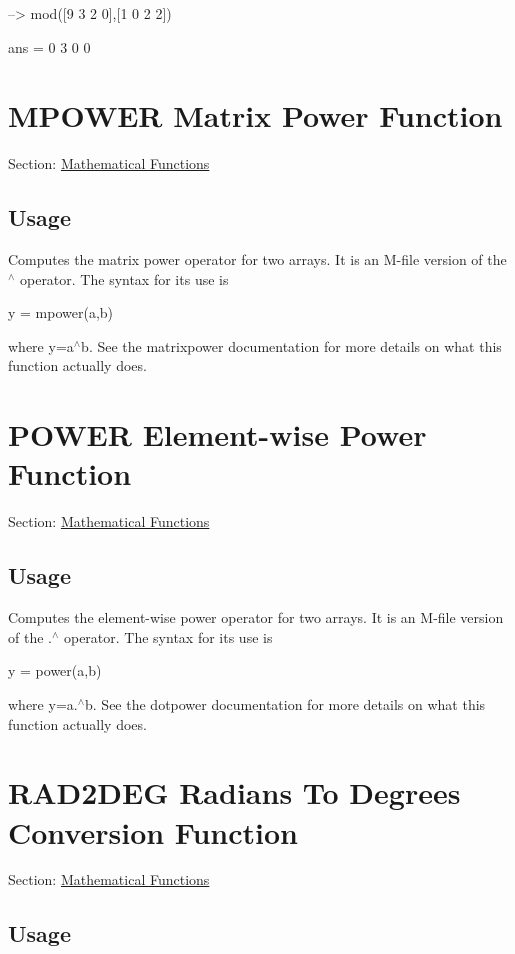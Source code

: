 \begin{DoxyVerbInclude}
--> mod([9 3 2 0],[1 0 2 2])

ans = 
 0 3 0 0 
\end{DoxyVerbInclude}
 \hypertarget{mathfunctions_mpower}{}\section{M\-P\-O\-W\-E\-R Matrix Power Function}\label{mathfunctions_mpower}
Section\-: \hyperlink{sec_mathfunctions}{Mathematical Functions} \hypertarget{vtkwidgets_vtkxyplotwidget_Usage}{}\subsection{Usage}\label{vtkwidgets_vtkxyplotwidget_Usage}
Computes the matrix power operator for two arrays. It is an M-\/file version of the {\ttfamily $^\wedge$} operator. The syntax for its use is \begin{DoxyVerb}   y = mpower(a,b)
\end{DoxyVerb}
 where {\ttfamily y=a$^\wedge$b}. See the {\ttfamily matrixpower} documentation for more details on what this function actually does. \hypertarget{mathfunctions_power}{}\section{P\-O\-W\-E\-R Element-\/wise Power Function}\label{mathfunctions_power}
Section\-: \hyperlink{sec_mathfunctions}{Mathematical Functions} \hypertarget{vtkwidgets_vtkxyplotwidget_Usage}{}\subsection{Usage}\label{vtkwidgets_vtkxyplotwidget_Usage}
Computes the element-\/wise power operator for two arrays. It is an M-\/file version of the {\ttfamily .$^\wedge$} operator. The syntax for its use is \begin{DoxyVerb}   y = power(a,b)
\end{DoxyVerb}
 where {\ttfamily y=a.$^\wedge$b}. See the {\ttfamily dotpower} documentation for more details on what this function actually does. \hypertarget{mathfunctions_rad2deg}{}\section{R\-A\-D2\-D\-E\-G Radians To Degrees Conversion Function}\label{mathfunctions_rad2deg}
Section\-: \hyperlink{sec_mathfunctions}{Mathematical Functions} \hypertarget{vtkwidgets_vtkxyplotwidget_Usage}{}\subsection{Usage}\label{vtkwidgets_vtkxyplotwidget_Usage}

